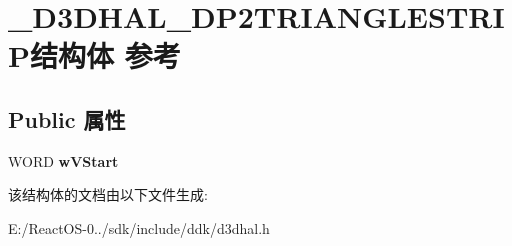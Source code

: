 \hypertarget{struct___d3_d_h_a_l___d_p2_t_r_i_a_n_g_l_e_s_t_r_i_p}{}\section{\+\_\+\+D3\+D\+H\+A\+L\+\_\+\+D\+P2\+T\+R\+I\+A\+N\+G\+L\+E\+S\+T\+R\+I\+P结构体 参考}
\label{struct___d3_d_h_a_l___d_p2_t_r_i_a_n_g_l_e_s_t_r_i_p}
\subsection*{Public 属性}
\begin{DoxyCompactItemize}
\item 
\mbox{\label{struct___d3_d_h_a_l___d_p2_t_r_i_a_n_g_l_e_s_t_r_i_p_afbeceacb4b50794e771ef58a6cdd0526}} 
W\+O\+RD {\bfseries w\+V\+Start}
\end{DoxyCompactItemize}


该结构体的文档由以下文件生成\+:\begin{DoxyCompactItemize}
\item 
E\+:/\+React\+O\+S-\/0../sdk/include/ddk/d3dhal.\+h\end{DoxyCompactItemize}
